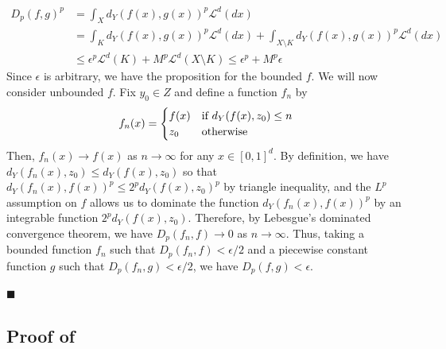 \documentclass[twoside,11pt]{article}
\theoremstyle{definition}
\begin{document}
\begin{enumerate}[leftmargin=*]
              \begin{align}
                  D_p(f,g)^p & = \int_{X}d_Y(f(x),g(x))^p\mathscr{L}^d(dx) \\
                  &= \int_{K}d_Y(f(x),g(x))^p\mathscr{L}^d(dx)  + \int_{X\setminus K}d_Y(f(x),g(x))^p\mathscr{L}^d(dx) \\ &\leq \epsilon^p\mathscr{L}^d (K) + M^p\mathscr{L}^d (X\setminus K) \leq \epsilon^p + M^p\epsilon
              \end{align}
              Since $\epsilon$ is arbitrary, we have the proposition for the bounded $f$. We will now consider unbounded $f$. Fix $y_0\in Z$ and define a function $f_n$ by
              \begin{equation}
                  f_n(x) = \begin{cases}
                      f(x) & \textnormal{if } d_Y(f(x),z_0)\leq n \\
                      z_0  & \textnormal{otherwise}
                  \end{cases}
              \end{equation}
              Then, $f_n(x)\to f(x)$ as $n\to \infty$ for any $x\in [0,1]^d$. By definition, we have $d_Y(f_n(x),z_0) \leq d_Y(f(x),z_0)$ so that $d_Y(f_n(x),f(x))^p \leq 2^p d_Y(f(x),z_0)^p$ by triangle inequality, and the $L^p$ assumption on $f$ allows us to dominate the function $d_Y(f_n(x),f(x))^p$ by an integrable function $2^p d_Y(f(x), z_0)$. Therefore, by Lebesgue's dominated convergence theorem, we have $D_p(f_n,f)\to 0$ as $n\to \infty$. Thus, taking a bounded function $f_n$ such that $D_p(f_n,f)<\epsilon/2$ and a piecewise constant function $g$ such that $D_p(f_n,g)<\epsilon/2$, we have $D_p(f,g)<\epsilon$.
    \end{enumerate}
    \hfill $\blacksquare$

\subsection{Proof of \texorpdfstring{}{Lemma \ref{lem: santam1.8general}}}\label{app: santam1.8general}
\end{document}
